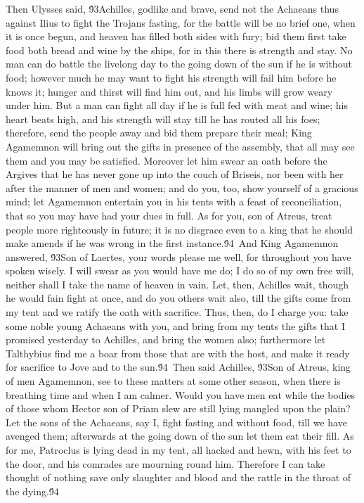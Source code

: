 {Then Ulysses said, \'93Achilles, godlike and brave, send not the Achaeans thus against Ilius to fight the Trojans fasting, for the battle will be no brief one, when it is once begun, and heaven has filled both sides with fury; bid them first take food both bread and wine by the ships, for in this there is strength and stay. No man can do battle the livelong day to the going down of the sun if he is without food; however much he may want to fight his strength will fail him before he knows it; hunger and thirst will find him out, and his limbs will grow weary under him. But a man can fight all day if he is full fed with meat and wine; his heart beats high, and his strength will stay till he has routed all his foes; therefore, send the people away and bid them prepare their meal; King Agamemnon will bring out the gifts in presence of the assembly, that all may see them and you may be satisfied. Moreover let him swear an oath before the Argives that he has never gone up into the couch of Briseis, nor been with her after the manner of men and women; and do you, too, show yourself of a gracious mind; let Agamemnon entertain you in his tents with a feast of reconciliation, that so you may have had your dues in full. As for you, son of Atreus, treat people more righteously in future; it is no disgrace even to a king that he should make amends if he was wrong in the first instance.\'94\
And King Agamemnon answered, \'93Son of Laertes, your words please me well, for throughout you have spoken wisely. I will swear as you would have me do; I do so of my own free will, neither shall I take the name of heaven in vain. Let, then, Achilles wait, though he would fain fight at once, and do you others wait also, till the gifts come from my tent and we ratify the oath with sacrifice. Thus, then, do I charge you: take some noble young Achaeans with you, and bring from my tents the gifts that I promised yesterday to Achilles, and bring the women also; furthermore let Talthybius find me a boar from those that are with the host, and make it ready for sacrifice to Jove and to the sun.\'94\
Then said Achilles, \'93Son of Atreus, king of men Agamemnon, see to these matters at some other season, when there is breathing time and when I am calmer. Would you have men eat while the bodies of those whom Hector son of Priam slew are still lying mangled upon the plain? Let the sons of the Achaeans, say I, fight fasting and without food, till we have avenged them; afterwards at the going down of the sun let them eat their fill. As for me, Patroclus is lying dead in my tent, all hacked and hewn, with his feet to the door, and his comrades are mourning round him. Therefore I can take thought of nothing save only slaughter and blood and the rattle in the throat of the dying.\'94\
}
